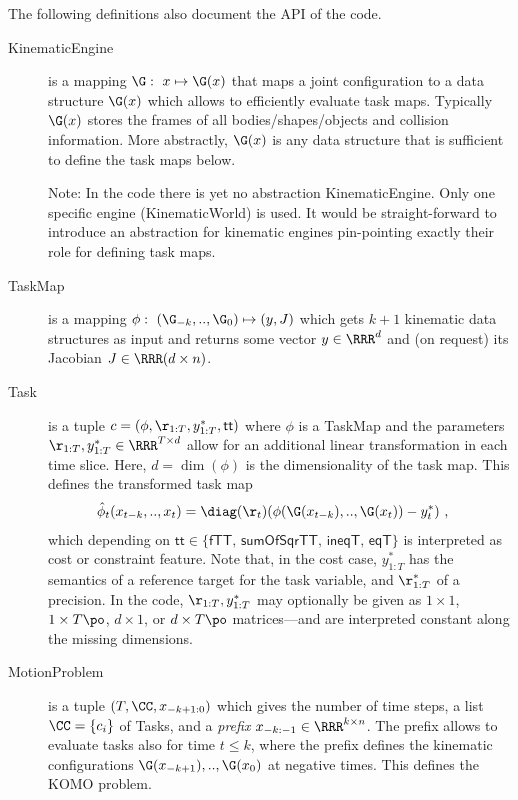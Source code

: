 \documentclass[10pt,fleqn,twoside]{article}
\begin{document}
{{The following definitions also document the API of the code.
\begin{description}
\item[KinematicEngine] is a mapping $\G:~ x \mapsto \G(x)$
that maps a joint configuration to a data structure $\G(x)$ which
allows to efficiently evaluate task maps. Typically $\G(x)$ stores
the frames of all bodies/shapes/objects and collision
information. More abstractly, $\G(x)$ is any data structure that is
sufficient to define the task maps below.

Note: In the code there is yet no abstraction KinematicEngine. Only
one specific engine (KinematicWorld) is used. It would be
straight-forward to introduce an abstraction for kinematic engines
pin-pointing exactly their role for defining task maps.

\item[TaskMap] is a mapping $\phi:~ (\G_{-k},..,\G_0) \mapsto
(y,J)$ which gets $k+1$ kinematic data structures as input and returns
some vector $y\in\RRR^d$ and (on request) its Jacobian $J\in\RRR(d\times n)$.

\item[Task] is a tuple $c=(\phi, \r_{1:T},
 y^*_{1:T},\textsf{tt})$ where $\phi$ is a TaskMap and the
parameters $\r_{1:T},y^*_{1:T} \in\RRR^{T\times d}$ allow for an
additional linear transformation in each time slice. Here,
$d=\dim(\phi)$ is the dimensionality of the task map. This defines the
transformed task map
\begin{align}
\hat\phi_t(x_{t-k},..,x_t)
& = \diag(\r_t) (\phi(\G(x_{t-k}),..,\G(x_t)) - y^*_t) ~,
\end{align}
which depending on $\textsf{tt}\in\{\textsf{fTT, sumOfSqrTT, ineqT, eqT}\}$ is
interpreted as cost or constraint feature. Note that, in the cost case,
$y^*_{1:T}$ has the semantics of a reference target for the task
variable, and $\r^*_{1:T}$ of a precision. In the code,
$\r_{1:T},y^*_{1:T}$ may optionally be given as $1\times 1$, $1\times
T\po$, $d\times 1$, or $d\times T\po$ matrices---and are interpreted
constant along the missing dimensions.

\item[MotionProblem] is a tuple $(T,\CC,x_{-k+1:0})$ which gives
the number of time steps, a list $\CC=\{c_i\}$ of Tasks, and
a \emph{prefix} $x_{-k:-1} \in\RRR^{k\times n}$. The prefix allows to
evaluate tasks also for time $t\le k$, where the prefix defines the
kinematic configurations $\G(x_{-k+1}),..,\G(x_0)$ at negative
times. This defines the KOMO problem.


\end{description}}}
\end{document}
